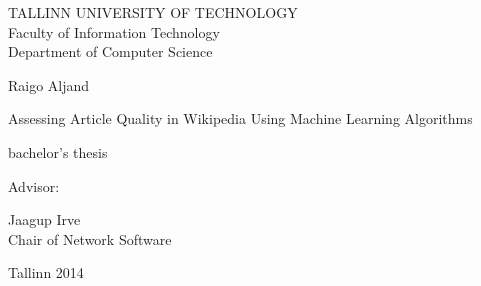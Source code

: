 \begin{titlepage}
	\newcommand{\fontsizex}[2]{{\fontsize{#1}{#1}\selectfont #2}}
	\newcommand{\fourteen}[1]{\fontsizex{14pt}{#1}}
	\newcommand{\twelve}[1]{\fontsizex{12pt}{#1}}
	
	\begin{center}
		\fourteen{TALLINN UNIVERSITY OF TECHNOLOGY \\
		Faculty of Information Technology \\
		Department of Computer Science}
		
		\vfill
		
		\fourteen{Raigo Aljand} \\
		
		\vspace{7mm}
		
		\fontsizex{20pt}{Assessing Article Quality in Wikipedia
		Using Machine Learning Algorithms} \\
		
		\vspace{7mm}
		
		\twelve{bachelor's thesis}
	\end{center}

	\vspace{20mm}
		
	\begin{flushright}
		\twelve{Advisor:}
		\begin{minipage}{101pt}
			\fourteen{
			Jaagup Irve \\
			Chair of Network Software}
		\end{minipage}
	\end{flushright}
	
	\vfill
	
	\begin{center}	
		\twelve{Tallinn 2014}
	\end{center}
\end{titlepage}
